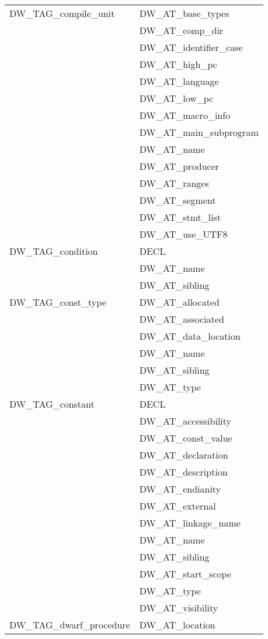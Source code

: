 \begin{longtable}{l|p{8cm}}
DW\_TAG\_compile\_unit
&DW\_AT\_base\_types \\
&DW\_AT\_comp\_dir \\
&DW\_AT\_identifier\_case \\
&DW\_AT\_high\_pc \\
&DW\_AT\_language \\
&DW\_AT\_low\_pc \\
&DW\_AT\_macro\_info \\
&DW\_AT\_main\_subprogram \\
&DW\_AT\_name \\
&DW\_AT\_producer \\
&DW\_AT\_ranges \\
&DW\_AT\_segment \\
&DW\_AT\_stmt\_list \\
&DW\_AT\_use\_UTF8 \\

DW\_TAG\_condition
&DECL \\
&DW\_AT\_name \\
&DW\_AT\_sibling \\

DW\_TAG\_const\_type
&DW\_AT\_allocated \\
&DW\_AT\_associated \\
&DW\_AT\_data\_location \\
&DW\_AT\_name \\
&DW\_AT\_sibling \\
&DW\_AT\_type \\

DW\_TAG\_constant
&DECL \\
&DW\_AT\_accessibility \\
&DW\_AT\_const\_value \\
&DW\_AT\_declaration \\
&DW\_AT\_description \\
&DW\_AT\_endianity \\
&DW\_AT\_external \\
&DW\_AT\_linkage\_name \\
&DW\_AT\_name \\
&DW\_AT\_sibling \\
&DW\_AT\_start\_scope \\
&DW\_AT\_type \\
&DW\_AT\_visibility \\

DW\_TAG\_dwarf\_procedure
&DW\_AT\_location \\


\end{longtable}
